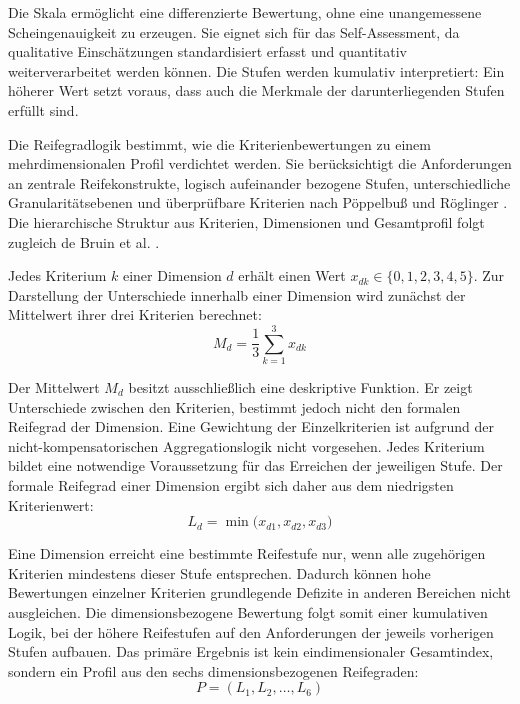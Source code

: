 \documentclass[10pt,a4paper]{article}
\begin{document}
Die Skala ermöglicht eine differenzierte Bewertung, ohne eine unangemessene Scheingenauigkeit zu erzeugen. Sie eignet sich für das Self-Assessment, da qualitative Einschätzungen standardisiert erfasst und quantitativ weiterverarbeitet werden können. Die Stufen werden kumulativ interpretiert: Ein höherer Wert setzt voraus, dass auch die Merkmale der darunterliegenden Stufen erfüllt sind.

Die Reifegradlogik bestimmt, wie die Kriterienbewertungen zu einem mehrdimensionalen Profil verdichtet werden. Sie berücksichtigt die Anforderungen an zentrale Reifekonstrukte, logisch aufeinander bezogene Stufen, unterschiedliche Granularitätsebenen und überprüfbare Kriterien nach Pöppelbuß und Röglinger \cite{PR11}. Die hierarchische Struktur aus Kriterien, Dimensionen und Gesamtprofil folgt zugleich de Bruin et al. \cite{dB05}.

Jedes Kriterium $k$ einer Dimension $d$ erhält einen Wert $x_{dk} \in \{0, 1, 2, 3, 4, 5\}$. Zur Darstellung der Unterschiede innerhalb einer Dimension wird zunächst der Mittelwert ihrer drei Kriterien berechnet:
\begin{equation}
M_d = \frac{1}{3} \sum_{k=1}^{3} x_{dk}
\end{equation}

Der Mittelwert $M_d$ besitzt ausschließlich eine deskriptive Funktion. Er zeigt Unterschiede zwischen den Kriterien, bestimmt jedoch nicht den formalen Reifegrad der Dimension. Eine Gewichtung der Einzelkriterien ist aufgrund der nicht-kompensatorischen Aggregationslogik nicht vorgesehen. Jedes Kriterium bildet eine notwendige Voraussetzung für das Erreichen der jeweiligen Stufe. Der formale Reifegrad einer Dimension ergibt sich daher aus dem niedrigsten Kriterienwert:
\begin{equation}
L_d = \min\bigl(x_{d1}, x_{d2}, x_{d3}\bigr)
\end{equation}

Eine Dimension erreicht eine bestimmte Reifestufe nur, wenn alle zugehörigen Kriterien mindestens dieser Stufe entsprechen. Dadurch können hohe Bewertungen einzelner Kriterien grundlegende Defizite in anderen Bereichen nicht ausgleichen. Die dimensionsbezogene Bewertung folgt somit einer kumulativen Logik, bei der höhere Reifestufen auf den Anforderungen der jeweils vorherigen Stufen aufbauen. Das primäre Ergebnis ist kein eindimensionaler Gesamtindex, sondern ein Profil aus den sechs dimensionsbezogenen Reifegraden:
\begin{equation}
P = (L_1, L_2, \dots, L_6)
\end{equation}
\end{document}
